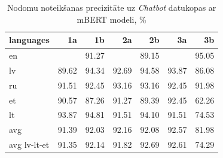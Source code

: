 \begin{table}[htbp]
  \centering
  \caption{Nodomu noteikšanas precizitāte uz \textit{Chatbot} datukopas ar mBERT modeli, \%}
    \begin{tabular}{lrrrrrr} \toprule
    languages & 1a & 1b & 2a & 2b & 3a & 3b \\\midrule
    en    &       & \cellcolor[rgb]{ .984,  .973,  .984}91.27 &       & \cellcolor[rgb]{ .984,  .929,  .941}89.15 &       & \cellcolor[rgb]{ .353,  .541,  .776}95.05 \\
    lv    & \cellcolor[rgb]{ .984,  .941,  .953}89.62 & \cellcolor[rgb]{ .502,  .647,  .831}94.34 & \cellcolor[rgb]{ .851,  .894,  .953}92.69 & \cellcolor[rgb]{ .455,  .612,  .812}94.58 & \cellcolor[rgb]{ .604,  .718,  .867}93.87 & \cellcolor[rgb]{ .984,  .871,  .882}86.08 \\
    ru    & \cellcolor[rgb]{ .984,  .976,  .988}91.51 & \cellcolor[rgb]{ .902,  .925,  .969}92.45 & \cellcolor[rgb]{ .753,  .824,  .918}93.16 & \cellcolor[rgb]{ .753,  .824,  .918}93.16 & \cellcolor[rgb]{ .902,  .925,  .969}92.45 & \cellcolor[rgb]{ .984,  .984,  .996}91.98 \\
    et    & \cellcolor[rgb]{ .984,  .957,  .969}90.57 & \cellcolor[rgb]{ .984,  .894,  .906}87.26 & \cellcolor[rgb]{ .984,  .973,  .984}91.27 & \cellcolor[rgb]{ .984,  .933,  .945}89.39 & \cellcolor[rgb]{ .902,  .925,  .969}92.45 & \cellcolor[rgb]{ .973,  .412,  .42}62.26 \\
    lt    & \cellcolor[rgb]{ .604,  .718,  .867}93.87 & \cellcolor[rgb]{ .404,  .576,  .796}94.81 & \cellcolor[rgb]{ .984,  .976,  .988}91.51 & \cellcolor[rgb]{ .553,  .682,  .847}94.10 & \cellcolor[rgb]{ .984,  .976,  .988}91.51 & \cellcolor[rgb]{ .976,  .647,  .655}74.53 \\\midrule
    avg   & \cellcolor[rgb]{ .984,  .973,  .984}91.39 & \cellcolor[rgb]{ .988,  .988,  1}92.03 & \cellcolor[rgb]{ .965,  .973,  .992}92.16 & \cellcolor[rgb]{ .98,  .984,  1}92.08 & \cellcolor[rgb]{ .875,  .91,  .961}92.57 & \cellcolor[rgb]{ .98,  .792,  .804}81.98 \\
    avg lv-lt-et & \cellcolor[rgb]{ .984,  .973,  .984}91.35 & \cellcolor[rgb]{ .969,  .973,  .992}92.14 & \cellcolor[rgb]{ .984,  .98,  .992}91.82 & \cellcolor[rgb]{ .851,  .894,  .953}92.69 & \cellcolor[rgb]{ .867,  .906,  .961}92.61 & \cellcolor[rgb]{ .976,  .643,  .651}74.29 \\\bottomrule
    \end{tabular}%
  \label{tab:chatbot-bert}%
\end{table}%




